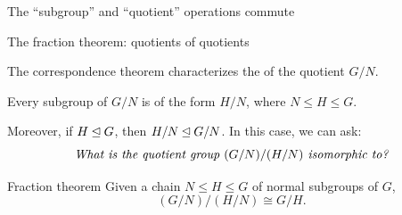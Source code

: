 \documentclass[8pt, handout]{beamer}
\newcommand{\Pause}{}      %
\begin{document}
\begin{frame}{The ``subgroup'' and ``quotient'' operations commute}
\end{frame}


\begin{frame}{The fraction theorem: quotients of quotients} \smallskip
  
  The correspondence theorem characterizes the  of the quotient $G/N$. \medskip\Pause

  Every subgroup of $G/N$ is of the form $H/N$, where $N\leq H\leq
  G$. \medskip\Pause

  Moreover, if $H\unlhd G$, then
  $H/N\unlhd G/N$. \Pause In this case, we can ask:
  \[
  \text{\emph{What is the quotient group $(G/N)/(H/N)$ isomorphic to?}}
  \]
  
  \vspace{-2mm}\Pause
  
  \begin{block}{Fraction theorem}
    Given a chain $N\leq H\leq G$ of normal subgroups of $G$,
    \[
    (G/N)/(H/N)\cong G/H.
    \]
  \end{block}
  
  \vspace{-4mm}


\end{frame}
\end{document}

